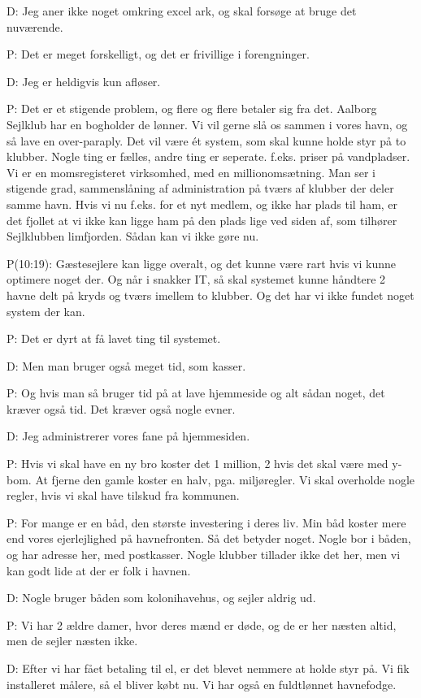 D: Jeg aner ikke noget omkring excel ark, og skal forsøge at bruge det nuværende.

P: Det er meget forskelligt, og det er frivillige i forengninger.

D: Jeg er heldigvis kun afløser.

P: Det er et stigende problem, og flere og flere betaler sig fra det. Aalborg Sejlklub har en bogholder de lønner. Vi vil gerne slå os sammen i vores havn, og så lave en over-paraply. Det vil være ét system, som skal kunne holde styr på to klubber. Nogle ting er fælles, andre ting er seperate. f.eks. priser på vandpladser. Vi er en momsregisteret virksomhed, med en millionomsætning. Man ser i stigende grad, sammenslåning af administration på tværs af klubber der deler samme havn. Hvis vi nu f.eks. for et nyt medlem, og ikke har plads til ham, er det fjollet at vi ikke kan ligge ham på den plads lige ved siden af, som tilhører Sejlklubben limfjorden. Sådan kan vi ikke gøre nu.

P(10:19): Gæstesejlere kan ligge overalt, og det kunne være rart hvis vi kunne optimere noget der. Og når i snakker IT, så skal systemet kunne håndtere 2 havne delt på kryds og tværs imellem to klubber. Og det har vi ikke fundet noget system der kan.

P: Det er dyrt at få lavet ting til systemet.

D: Men man bruger også meget tid, som kasser.

P: Og hvis man så bruger tid på at lave hjemmeside og alt sådan noget, det kræver også tid. Det kræver også nogle evner.

D: Jeg administrerer vores fane på hjemmesiden.

P: Hvis vi skal have en ny bro koster det 1 million, 2 hvis det skal være med y-bom. At fjerne den gamle koster en halv, pga. miljøregler. Vi skal overholde nogle regler, hvis vi skal have tilskud fra kommunen.

P: For mange er en båd, den største investering i deres liv. Min båd koster mere end vores ejerlejlighed på havnefronten. Så det betyder noget. Nogle bor i båden, og har adresse her, med postkasser. Nogle klubber tillader ikke det her, men vi kan godt lide at der er folk i havnen.

D: Nogle bruger båden som kolonihavehus, og sejler aldrig ud.

P: Vi har 2 ældre damer, hvor deres mænd er døde, og de er her næsten altid, men de sejler næsten ikke.

D: Efter vi har fået betaling til el, er det blevet nemmere at holde styr på. Vi fik installeret målere, så el bliver købt nu. Vi har også en fuldtlønnet havnefodge.

